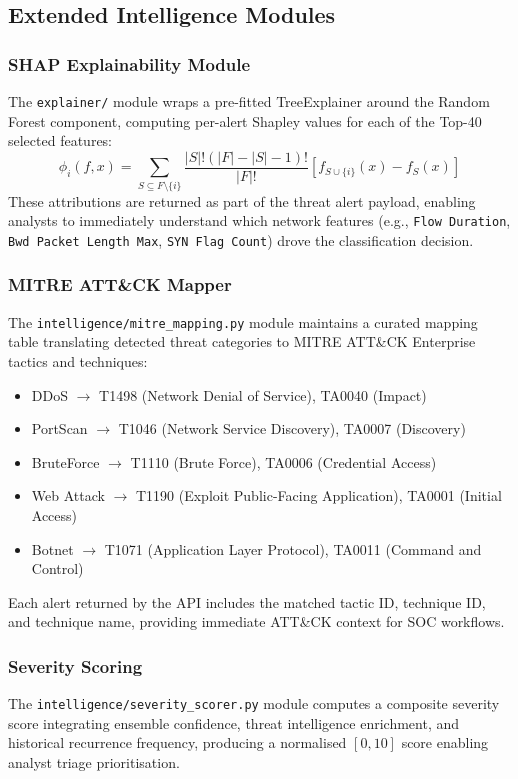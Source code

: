\documentclass[conference]{IEEEtran}
\begin{document}
\subsection{Extended Intelligence Modules}

\subsubsection{SHAP Explainability Module}
The \texttt{explainer/} module wraps a pre-fitted TreeExplainer around the Random Forest component, computing per-alert Shapley values for each of the Top-40 selected features:
\begin{equation}
    \phi_i(f, x) = \sum_{S \subseteq F \setminus \{i\}} \frac{|S|!(|F|-|S|-1)!}{|F|!} \left[f_{S \cup \{i\}}(x) - f_S(x)\right]
\end{equation}
These attributions are returned as part of the threat alert payload, enabling analysts to immediately understand which network features (e.g., \texttt{Flow Duration}, \texttt{Bwd Packet Length Max}, \texttt{SYN Flag Count}) drove the classification decision.

\subsubsection{MITRE ATT\&CK Mapper}
The \texttt{intelligence/mitre\_mapping.py} module maintains a curated mapping table translating detected threat categories to MITRE ATT\&CK Enterprise tactics and techniques:
\begin{itemize}
    \item DDoS $\rightarrow$ T1498 (Network Denial of Service), TA0040 (Impact)
    \item PortScan $\rightarrow$ T1046 (Network Service Discovery), TA0007 (Discovery)
    \item BruteForce $\rightarrow$ T1110 (Brute Force), TA0006 (Credential Access)
    \item Web Attack $\rightarrow$ T1190 (Exploit Public-Facing Application), TA0001 (Initial Access)
    \item Botnet $\rightarrow$ T1071 (Application Layer Protocol), TA0011 (Command and Control)
\end{itemize}
Each alert returned by the API includes the matched tactic ID, technique ID, and technique name, providing immediate ATT\&CK context for SOC workflows.

\subsubsection{Severity Scoring}
The \texttt{intelligence/severity\_scorer.py} module computes a composite severity score integrating ensemble confidence, threat intelligence enrichment, and historical recurrence frequency, producing a normalised $[0,10]$ score enabling analyst triage prioritisation.
\end{document}
